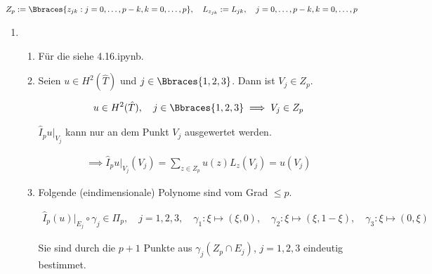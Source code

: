   
  \begin{solution}
  
  \begin{align*}
    Z_p
    :=
    \Bbraces{z_{jk}: j = 0, \dots, p - k, k = 0, \dots, p},
    \quad
    L_{z_{jk}}
    :=
    L_{jk},
    \quad
    j = 0, \dots, p - k, k = 0, \dots, p
  \end{align*}
  
  \begin{enumerate}[label = \textbf{\alph*)}]
  
    \item
  
    \begin{enumerate}[label = (\roman*)]
  
      \item Für die  siehe 4.16.ipynb.
  
      \item Seien $u \in H^2(\hat T)$ und $j \in \Bbraces{1, 2, 3}$.
      Dann ist $V_j \in Z_p$.
  
      \begin{align*}
        u \in H^2(\hat T),
        \quad
        j \in \Bbraces{1, 2, 3}
        \implies
        V_j \in Z_p
      \end{align*}
  
      $\hat I_p u|_{V_j}$ kann nur an dem Punkt $V_j$ ausgewertet werden.
  
      \begin{align*}
        \implies
        \hat I_p u|_{V_j}(V_j)
        =
        \sum_{z \in Z_p}
        u(z) L_z(V_j)
        =
        u(V_j)
      \end{align*}
  
      \item Folgende (eindimensionale) Polynome sind vom Grad $\leq p$.
  
      \begin{align*}
        \hat I_p(u)|_{E_j} \circ \gamma_j \in \Pi_p,
        \quad
        j = 1, 2, 3,
        \quad
        \gamma_1: \xi \mapsto (\xi, 0),
        \quad
        \gamma_2: \xi \mapsto (\xi, 1 - \xi),
        \quad
        \gamma_3: \xi \mapsto (0, \xi)
      \end{align*}
  
      Sie sind durch die $p + 1$ Punkte aus $\gamma_j(Z_p \cap E_j)$, $j = 1, 2, 3$ eindeutig bestimmet.
  

\end{enumerate}
\end{enumerate}
\end{solution}
